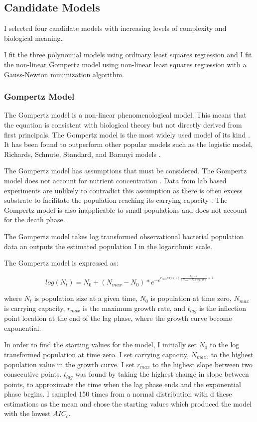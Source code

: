 \documentclass[11pt]{article}
\begin{document}
  \subsection{Candidate Models}
  I selected four candidate models with increasing levels of complexity and biological meaning.

  I fit the three polynomial models using ordinary least squares regression and I fit the non-linear Gompertz model using non-linear least squares regression with a Gauss-Newton minimization algorithm.
  \subsubsection{Gompertz Model}
  The Gompertz model is a non-linear phenomenological model. This means that the equation is consistent with biological theory but not directly derived from first principals. The Gompertz model is the most widely used model of its kind \citep{Peleg2011}. It has been found to outperform other popular models such as the logistic model, Richards, Schnute, Standard, and Baranyi models \citep{Peleg2011,Zwietering1990}.

  The Gompertz model has assumptions that must be considered. The Gompertz model does not account for nutrient concentration \citep{Allen2018}. Data from lab based experiments are unlikely to contradict this assumption as there is often excess substrate to facilitate the population reaching its carrying capacity \citep{Zwietering1990}. The Gompertz model is also inapplicable to small populations \citep{Allen2018} and does not account for the death phase. 

  The Gompertz model takes log transformed observational bacterial population data an outputs the  estimated population I in the logarithmic scale.

  The Gompertz model is expressed as:


  \begin{equation}
    log(N_{t}) = N_{0} + (N_{max} - N_{0})* e^{-e^{r_{max}exp(1)\frac{t_{lag}-t}{(N_{max}- N_{0})log(10)}+1}}
  \end{equation}
  
  where $N_{t}$ is population size at a given time, $N_{0}$  is population at time zero, $N_{max}$  is carrying capacity, $r_{max}$ is the maximum growth rate, and $t_{lag}$  is the inflection point location at the end of the lag phase, where the growth curve become exponential. 

  In order to find the starting values for the model, I initially set $N_{0}$ to the log transformed population at time zero. I set carrying capacity, $N_{max}$, to the highest population value in the growth curve. I set $r_{max}$ to the highest slope between two consecutive points. $t_{lag}$ was found by taking the highest change in slope between points, to approximate the time when the lag phase ends and the exponential phase begins. I sampled 150 times from a normal distribution with d these estimations as the mean and chose the starting values which produced the model with the lowest $AIC_{c}$.
  
\end{document}
